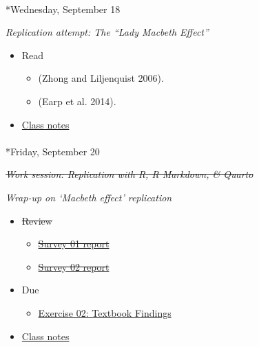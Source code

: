 \documentclass[
  letterpaper,
  DIV=11,
  numbers=noendperiod]{scrartcl}
\makeatletter
\let\oldparagraph\paragraph
\renewcommand{\paragraph}{
    \@ifstar
      \xxxParagraphStar
      \xxxParagraphNoStar
  }
\newcommand{\xxxParagraphStar}[1]{\oldparagraph*{#1}\mbox{}}
\newcommand{\xxxParagraphNoStar}[1]{\oldparagraph{#1}\mbox{}}
\providecommand{\tightlist}{%
  \setlength{\itemsep}{0pt}\setlength{\parskip}{0pt}}\usepackage{longtable,booktabs,array}
\makeatother
\begin{document}
\paragraph*{Wednesday, September 18}\label{wednesday-september-18}

\emph{Replication attempt: The ``Lady Macbeth Effect''}

\begin{itemize}
\tightlist
\item
  Read

  \begin{itemize}
  \tightlist
  \item
    (Zhong and Liljenquist 2006).
  \item
    (Earp et al. 2014).
  \end{itemize}
\item
  \href{notes/wk04-2024-09-18-replication-lady-macbeth.qmd}{Class notes}
\end{itemize}

\paragraph*{Friday, September 20}\label{friday-september-20}

\st{\emph{Work session: Replication with R, R Markdown, \& Quarto}}

\emph{Wrap-up on `Macbeth effect' replication}

\begin{itemize}
\tightlist
\item
  \st{Review}

  \begin{itemize}
  \tightlist
  \item
    \st{\href{surveys/survey-01.qmd}{Survey 01 report}}
  \item
    \st{\href{surveys/survey-02.qmd}{Survey 02 report}}
  \end{itemize}
\item
  {Due}

  \begin{itemize}
  \tightlist
  \item
    \href{exercises/ex02-textbook-findings.qmd}{Exercise 02: Textbook
    Findings}
  \end{itemize}
\item
  \href{notes/wk04-2024-09-20-work-session-R.qmd}{Class notes}
\end{itemize}
\end{document}
